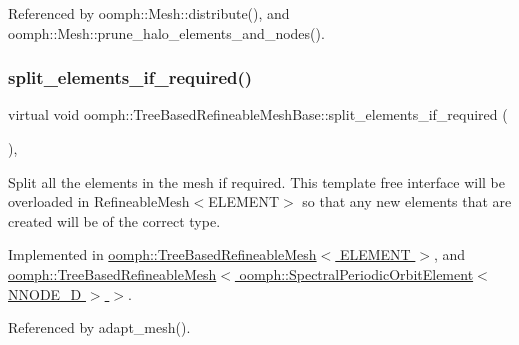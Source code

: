 Referenced by oomph\+::\+Mesh\+::distribute(), and oomph\+::\+Mesh\+::prune\+\_\+halo\+\_\+elements\+\_\+and\+\_\+nodes().

\mbox{\label{classoomph_1_1TreeBasedRefineableMeshBase_a86dace1f78991fb9b401a31215df89ef}} 
\subsubsection{\texorpdfstring{split\+\_\+elements\+\_\+if\+\_\+required()}{split\_elements\_if\_required()}}
{\footnotesize\ttfamily virtual void oomph\+::\+Tree\+Based\+Refineable\+Mesh\+Base\+::split\+\_\+elements\+\_\+if\+\_\+required (\begin{DoxyParamCaption}{ }\end{DoxyParamCaption})\hspace{0.3cm}{\ttfamily [protected]}, {}}



Split all the elements in the mesh if required. This template free interface will be overloaded in Refineable\+Mesh$<$\+E\+L\+E\+M\+E\+N\+T$>$ so that any new elements that are created will be of the correct type. 



Implemented in \hyperlink{classoomph_1_1TreeBasedRefineableMesh_a43f134cb974f25f25d5ddfa88d56ef95}{oomph\+::\+Tree\+Based\+Refineable\+Mesh$<$ E\+L\+E\+M\+E\+N\+T $>$}, and \hyperlink{classoomph_1_1TreeBasedRefineableMesh_a43f134cb974f25f25d5ddfa88d56ef95}{oomph\+::\+Tree\+Based\+Refineable\+Mesh$<$ oomph\+::\+Spectral\+Periodic\+Orbit\+Element$<$ N\+N\+O\+D\+E\+\_\+D $>$ $>$}.



Referenced by adapt\+\_\+mesh().

\mbox{\label{classoomph_1_1TreeBasedRefineableMeshBase_a0ba902eb4b63aaa8c4da1aadcf25709a}} 
